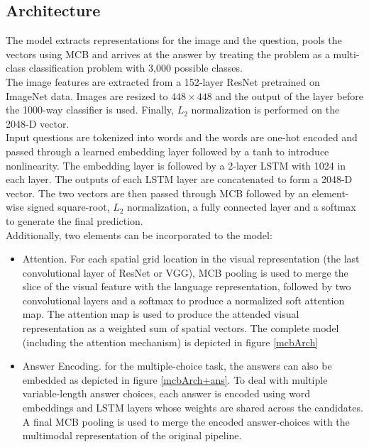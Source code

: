 \documentclass{article}
\begin{document}
\subsection{Architecture}
The model extracts representations for the image and the question, pools the vectors using MCB and arrives at the answer by treating the problem as a multi-class classification problem with 3,000 possible classes.\\
The image features are extracted from a 152-layer ResNet pretrained on ImageNet data. Images are resized to $448 \times 448$ and the output of the layer before the 1000-way classifier is used. Finally, $L_2$ normalization is performed on the 2048-D vector.\\
Input questions are tokenized into words and the words are one-hot encoded and passed through a learned embedding layer followed by a tanh to introduce nonlinearity. The embedding layer is followed by a 2-layer LSTM with 1024 in each layer. The outputs of each LSTM layer are concatenated to form a 2048-D vector. The two vectors are then passed through MCB followed by an element-wise signed square-root, $L_2$ normalization, a fully connected layer and a softmax to generate the final prediction.\\
Additionally, two elements can be incorporated to the model:
\begin{itemize}
    \item Attention. For each spatial grid location in the visual representation (the last convolutional layer of ResNet or VGG), MCB pooling is used to merge the slice of the visual feature with the language representation, followed by two convolutional layers and a softmax to produce a normalized soft attention map. The attention map is used to produce the attended visual representation as a weighted sum of spatial vectors. The complete model (including the attention mechanism) is depicted in figure \ref{mcbArch}
    \item Answer Encoding. for the multiple-choice task, the answers can also be embedded as depicted in figure \ref{mcbArch+ans}. To deal with multiple variable-length answer choices, each answer is encoded using word embeddings and LSTM layers whose weights are shared across the candidates. A final MCB pooling is used to merge the encoded answer-choices with the multimodal representation of the original pipeline.
\end{itemize}
\end{document}
